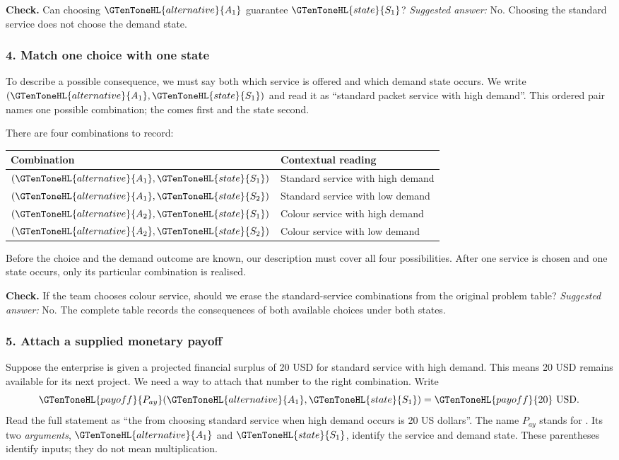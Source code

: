 \textbf{Check.} Can choosing $\GTenToneHL{alternative}{A_1}$ guarantee $\GTenToneHL{state}{S_1}$? \emph{Suggested answer:} No. Choosing the standard service does not choose the demand state.

\subsubsection*{4. Match one choice with one state}
To describe a possible consequence, we must say both which service is offered and which demand state occurs. We write $(\GTenToneHL{alternative}{A_1},\GTenToneHL{state}{S_1})$ and read it as ``standard packet service with high demand''. This ordered pair names one possible combination; the  comes first and the state second.

There are four combinations to record:
\begin{center}
\begin{tabular}{ll}
\toprule Combination & Contextual reading \\ \midrule
$(\GTenToneHL{alternative}{A_1},\GTenToneHL{state}{S_1})$ & Standard service with high demand \\
$(\GTenToneHL{alternative}{A_1},\GTenToneHL{state}{S_2})$ & Standard service with low demand \\
$(\GTenToneHL{alternative}{A_2},\GTenToneHL{state}{S_1})$ & Colour service with high demand \\
$(\GTenToneHL{alternative}{A_2},\GTenToneHL{state}{S_2})$ & Colour service with low demand \\
\bottomrule
\end{tabular}
\end{center}
Before the choice and the demand outcome are known, our description must cover all four possibilities. After one service is chosen and one state occurs, only its particular combination is realised.

\textbf{Check.} If the team chooses colour service, should we erase the standard-service combinations from the original problem table? \emph{Suggested answer:} No. The complete table records the consequences of both available choices under both states.

\subsubsection*{5. Attach a supplied monetary payoff}
Suppose the enterprise is given a projected financial surplus of 20 USD for standard service with high demand. This means 20 USD remains available for its next project. We need a way to attach that number to the right combination. Write
\[\GTenToneHL{payoff}{P_{ay}}(\GTenToneHL{alternative}{A_1},\GTenToneHL{state}{S_1})=\GTenToneHL{payoff}{20}\text{ USD}.\]
Read the full statement as ``the  from choosing standard service when high demand occurs is 20 US dollars''. The name $P_{ay}$ stands for . Its two \emph{arguments}, $\GTenToneHL{alternative}{A_1}$ and $\GTenToneHL{state}{S_1}$, identify the service and demand state. These parentheses identify inputs; they do not mean multiplication.

